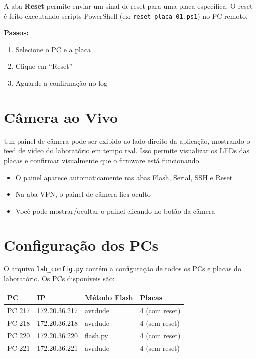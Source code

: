 \documentclass[12pt,a4paper]{article}
\begin{document}
A aba \textbf{Reset} permite enviar um sinal de reset para uma placa específica. O reset é feito executando scripts PowerShell (ex: \texttt{reset\_placa\_01.ps1}) no PC remoto.

\textbf{Passos:}
\begin{enumerate}[nosep]
  \item Selecione o PC e a placa
  \item Clique em ``Reset''
  \item Aguarde a confirmação no log
\end{enumerate}

\section{Câmera ao Vivo}

Um painel de câmera pode ser exibido ao lado direito da aplicação, mostrando o feed de vídeo do laboratório em tempo real. Isso permite visualizar os LEDs das placas e confirmar visualmente que o firmware está funcionando.

\begin{itemize}[nosep]
  \item O painel aparece automaticamente nas abas Flash, Serial, SSH e Reset
  \item Na aba VPN, o painel de câmera fica oculto
  \item Você pode mostrar/ocultar o painel clicando no botão da câmera
\end{itemize}

\section{Configuração dos PCs}

O arquivo \texttt{lab\_config.py} contém a configuração de todos os PCs e placas do laboratório. Os PCs disponíveis são:

\begin{center}
\begin{tabular}{llll}
  \toprule
  \textbf{PC} & \textbf{IP} & \textbf{Método Flash} & \textbf{Placas} \\
  \midrule
  PC 217 & 172.20.36.217 & avrdude  & 4 (com reset) \\
  PC 218 & 172.20.36.218 & avrdude  & 4 (sem reset) \\
  PC 220 & 172.20.36.220 & flash.py & 4 (com reset) \\
  PC 221 & 172.20.36.221 & avrdude  & 4 (sem reset) \\
  \bottomrule
\end{tabular}
\end{center}
\end{document}

